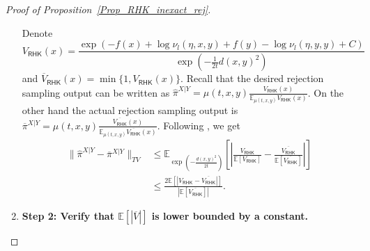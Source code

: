 \begin{proof}[Proof of Proposition~\ref{Prop_RHK_inexact_rej}]
\begin{enumerate}
        Denote $$V_{\mathsf{RHK}}(x) = \frac{\exp(-f(x) + \log \nu_{l}(\eta, x, y) + f(y) - \log \nu_{l}(\eta, y, y) + C)}{\exp(-\frac{1}{2t} d(x, y)^{2})}$$ 
        and $\overline{V}_{\mathsf{RHK}}(x) = \min\{1, V_{\mathsf{RHK}}(x)\}$. 
        Recall that the desired rejection sampling output can be written as $\hat{\pi}^{X|Y} = \mu(t, x, y) \frac{V_{\mathsf{RHK}}(x)}{\mathbb{E}_{\mu(t, x, y)} V_{\mathsf{RHK}}(x)}$. 
        On the other hand the actual rejection sampling output is $\overline{\pi}^{X|Y} = \mu(t, x, y) \frac{\overline{V_{\mathsf{RHK}}}(x)}{\mathbb{E}_{\mu(t, x, y)} \overline{V_{\mathsf{RHK}}}(x)} $.
        Following \citet[Proof of Theorem 6]{fan2023improved}, we get 
        \begin{align*}
                \|\hat{\pi}^{X|Y} - \overline{\pi}^{X|Y}\|_{TV} 
                &\le \mathbb{E}_{\exp(-\frac{d(x, y)^{2}}{2t})}[|\frac{V_{\mathsf{RHK}}}{\mathbb{E}[V_{\mathsf{RHK}}]} - \frac{\overline{V_{\mathsf{RHK}}}}{\mathbb{E}[\overline{V_{\mathsf{RHK}}}]}|] \\
                &\le \frac{2\mathbb{E}[|V_{\mathsf{RHK}} - \overline{V_{\mathsf{RHK}}}|]}{|\mathbb{E}[\overline{V_{\mathsf{RHK}}}]|}.
        \end{align*}
        
        
        \item \textbf{Step 2: Verify that $\mathbb{E}[|\overline{V}|]$ is lower bounded by a constant.}


\end{enumerate}
\end{proof}
